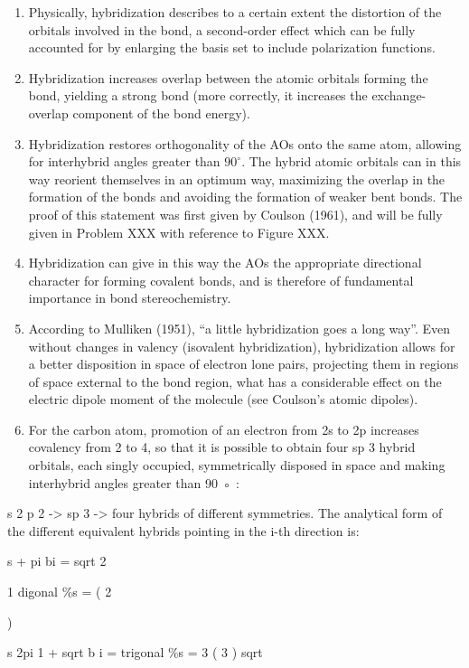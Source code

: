 \documentclass[
  9pt,
]{extbook}
\theoremstyle{definition}
\theoremstyle{definition}
\theoremstyle{definition}
\theoremstyle{remark}
\begin{document}
\begin{enumerate}
\def\labelenumi{(\roman{enumi})}
\item
  Physically, hybridization describes to a certain extent the distortion of the orbitals involved in the bond, a second-order effect which can be fully accounted for by enlarging the basis set to include polarization functions.
\item
  Hybridization increases overlap between the atomic orbitals forming the bond, yielding a strong bond (more correctly, it increases the exchange-overlap component of the bond energy).
\item
  Hybridization restores orthogonality of the AOs onto the same atom, allowing for interhybrid angles greater than \(90^{\circ}\). The hybrid atomic orbitals can in this way reorient themselves in an optimum way, maximizing the overlap in the formation of the bonds and avoiding the formation of weaker bent bonds. The proof of this statement was ﬁrst given by Coulson (1961), and will be fully given in Problem XXX with reference to Figure XXX.
\item
  Hybridization can give in this way the AOs the appropriate directional character for forming covalent bonds, and is therefore of fundamental importance in bond stereochemistry.
\item
  According to Mulliken (1951), ``a little hybridization goes a long way''. Even without changes in valency (isovalent hybridization), hybridization allows for a better disposition in space of electron lone pairs, projecting them in regions of space external to the bond region, what has a considerable effect on the electric dipole moment of the molecule (see Coulson's atomic dipoles).
\item
  For the carbon atom, promotion of an electron from 2s to 2p increases covalency from 2 to 4, so that it is possible to obtain four sp 3 hybrid orbitals, each singly occupied, symmetrically disposed in space and making interhybrid angles greater than 90 ◦ :
\end{enumerate}

s 2 p 2 -\textgreater{} sp 3 -\textgreater{} four hybrids of different symmetries.
The analytical form of the different equivalent hybrids pointing in the i-th direction is:

s + pi bi = sqrt 2

1 digonal \%s = ( 2

)

s 2pi 1 + sqrt b i = trigonal \%s = 3 ( 3 ) sqrt
\end{document}
